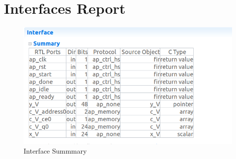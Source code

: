 \documentclass{article}
\begin{document}
\vspace{10cm}


\section{Interfaces Report}
\vspace{1cm}
\begin{figure}[h]
    \centering
\includegraphics[width=\columnwidth]{figs/3.png}
    \caption{Interface Summmary}
    \label{fig:my_label}
\end{figure}
\vspace{5cm}
\end{document}
